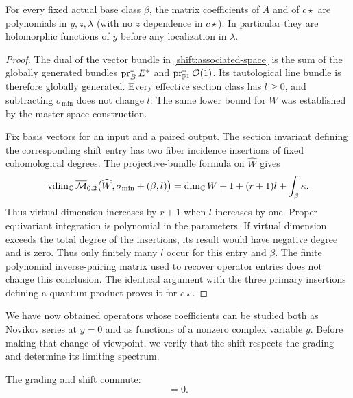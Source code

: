 \begin{lemma}
\label{shift:polynomiality}
For every fixed actual base class $\beta$, the matrix coefficients
of $A$ and of $c\star$ are polynomials in $y,z,\lambda$ (with no
$z$ dependence in $c\star$).  In particular they are holomorphic
functions of $y$ before any localization in $\lambda$.
\end{lemma}

\begin{proof}
The dual of the vector bundle in \eqref{shift:associated-space} is
the sum of the globally generated bundles $\operatorname{pr}_B^*E^*$ and
$\operatorname{pr}_{\mathbb P^1}^*\mathcal O(1)$.  Its tautological line bundle
is therefore globally generated.  Every effective section class has
$l\geq0$, and subtracting $\sigma_{\min}$ does not change $l$.
The same lower bound for $W$ was established by the master-space
construction.

Fix basis vectors for an input and a paired output.  The section
invariant defining the corresponding shift entry has two fiber
incidence insertions of fixed cohomological degrees.  The
projective-bundle formula on $\widehat W$ gives
\begin{equation}
 \operatorname{vdim}_{\mathbb C}
 \overline{\mathcal M}_{0,2}
       \bigl(\widehat W,\sigma_{\min}+(\beta,l)\bigr)
   =\dim_\mathbb C W+1+(r+1)l+\int_\beta\kappa.
 \label{shift:section-dimension}
\end{equation}
Thus virtual dimension increases by $r+1$ when $l$ increases by
one.  Proper equivariant integration is polynomial in the
parameters.  If virtual dimension exceeds the total degree of the
insertions, its result would have negative degree and is zero.
Thus only finitely many $l$ occur for this entry and $\beta$.
The finite polynomial inverse-pairing matrix used to recover
operator entries does not change this conclusion.  The identical
argument with the three primary insertions defining a quantum
product proves it for $c\star$.
\end{proof}

We have now obtained operators whose coefficients can be studied
both as Novikov series at $y=0$ and as functions of a nonzero complex
variable $y$.  Before making that change of viewpoint, we verify
that the shift respects the grading and determine its limiting
spectrum.

\begin{lemma}
\label{shift:commutation-lemma}
The grading and shift commute:
\begin{equation}
                          [G_a,T_a]=0.
 \label{shift:commutation}
\end{equation}
\end{lemma}

